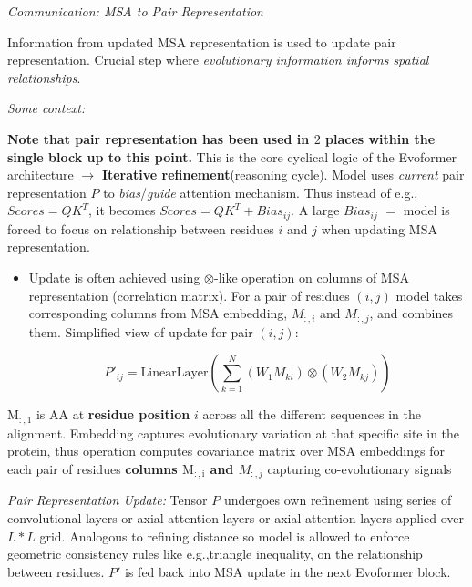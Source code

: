 \documentclass[../main.tex]{subfiles}
\begin{document}
\vspace{0.3cm}

\textit{\large{Communication: MSA to Pair Representation}}

\vspace{0.3cm}

Information from updated MSA representation is used to update pair representation. Crucial step where \textit{evolutionary information informs spatial relationships}. 

\vspace{0.3cm}

\textit{\large{Some context:}}

\textbf{Note that pair representation has been used in $2$ places within the single block up to this point.} This is the core cyclical logic of the Evoformer architecture $\rightarrow$ \textbf{Iterative refinement}(reasoning cycle). Model uses \textit{current} pair representation $P$ to \textit{bias}/\textit{guide} attention mechanism. 
Thus instead of e.g., $Scores=QK^T$, it becomes $Scores=QK^T + Bias_{ij}$. A large $Bias_{ij}$ $=$ model is forced to focus on relationship between residues $i$ and $j$ when updating MSA representation.

\begin{itemize}
    \item Update is often achieved using $\otimes$-like operation on columns of MSA representation (correlation matrix). For a pair of residues $(i, j)$  model takes corresponding columns from MSA embedding, $M_{:,i}$ and $M_{:,j}$, and combines them. Simplified view of update for pair $(i, j)$:  
    
\begin{equation}
    P'_{ij} = \text{LinearLayer}\left(\sum_{k=1}^{N} \left(W_1 M_{ki}\right) \otimes \left(W_2 M_{kj}\right)\right)
 \end{equation}
    
\end{itemize}

$\mathrm{M_{:,1}}$ is AA at \textbf{residue position} $i$ across all the different sequences in the alignment. Embedding captures evolutionary variation at that specific site in the protein, thus operation computes covariance matrix over MSA embeddings for each pair of residues \textbf{columns $\mathrm{M_{:,i}}$ and $M_{:,j}$} capturing co-evolutionary signals

\vspace{0.3cm}

\textit{\large{Pair Representation Update:}} Tensor $P$ undergoes own refinement using series of convolutional layers or axial attention layers or axial attention layers applied over $L*L$ grid. Analogous to refining distance so model is allowed to enforce geometric consistency rules like e.g.,triangle inequality, on the relationship between residues. $P'$ is fed back into MSA update in the next Evoformer block.
\end{document}
